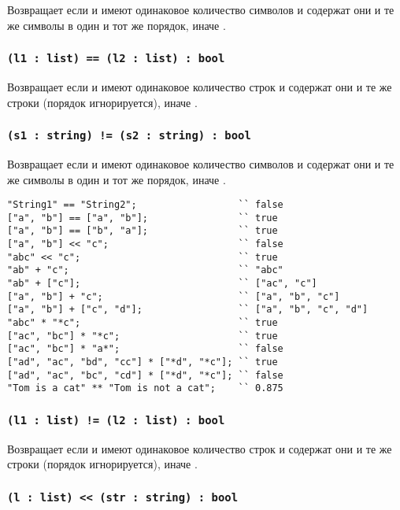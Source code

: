 Возвращает \true{} если  и  имеют одинаковое количество символов и содержат они и те же символы в один и тот же порядок, иначе \false{}.

\subsubsection{\lstinline`(l1 : list) == (l2 : list) : bool`}

Возвращает \true{} если  и  имеют одинаковое количество строк и содержат они и те же строки (порядок игнорируется), иначе \false{}.

\subsubsection{\lstinline`(s1 : string) != (s2 : string) : bool`}

Возвращает \false{} если  и  имеют одинаковое количество символов и содержат они и те же символы в один и тот же порядок, иначе \true{}.

\begin{lstlisting}[caption=Примеры использования операторов над данными типа string и list, label=stringlistopex]
"String1" == "String2";					 `` false
["a", "b"] == ["a", "b"];				 `` true
["a", "b"] == ["b", "a"];				 `` true
["a", "b"] << "c";						 `` false
"abc" << "c";							 `` true
"ab" + "c";								 `` "abc"
"ab" + ["c"];							 `` ["ac", "c"]
["a", "b"] + "c";						 `` ["a", "b", "c"]
["a", "b"] + ["c", "d"];				 `` ["a", "b", "c", "d"]
"abc" * "*c";							 `` true
["ac", "bc"] * "*c";					 `` true
["ac", "bc"] * "a*";					 `` false
["ad", "ac", "bd", "cc"] * ["*d", "*c"]; `` true
["ad", "ac", "bc", "cd"] * ["*d", "*c"]; `` false
"Tom is a cat" ** "Tom is not a cat";	 `` 0.875
\end{lstlisting}

\subsubsection{\lstinline`(l1 : list) != (l2 : list) : bool`}

Возвращает \false{} если  и  имеют одинаковое количество строк и содержат они и те же строки (порядок игнорируется), иначе \true{}.

\subsubsection{\lstinline`(l : list) << (str : string) : bool`}


